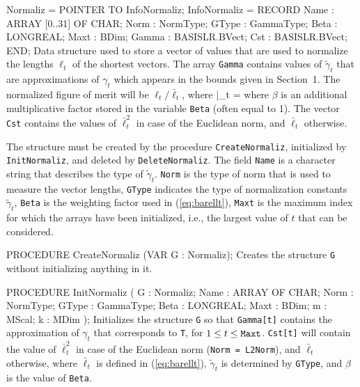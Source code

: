    Normaliz = POINTER TO InfoNormaliz;
   InfoNormaliz = RECORD
      Name  : ARRAY [0..31] OF CHAR;
      Norm  : NormType;
      GType : GammaType;
      Beta  : LONGREAL;
      Maxt  : BDim;
      Gamma : BASISLR.BVect;
      Cst   : BASISLR.BVect;
      END;
\endcode
  \tabb Data structure used to store a vector of values 
   that are used to normalize the lengths
   $\ell_t$ of the shortest vectors.  
   The array {\tt Gamma} contains values of $\tilde\gamma_t$ that are  
   approximations of $\gamma_t$ which appears in the bounds given
   in Section~1.
   The normalized figure of merit will be $\ell_t/\bar\ell_t$, where
  \eq             
    \bar\ell_t = 
  \endeq
   where $\beta$ is an additional multiplicative factor 
   stored in the variable {\tt Beta} (often equal to 1).
   The vector {\tt Cst} contains the values of $\bar\ell_t^2$ 
   in case of the Euclidean norm, and $\bar\ell_t$ otherwise.

   The structure must be created by the procedure {\tt CreateNormaliz},
   initialized by {\tt InitNormaliz}, and deleted by
   {\tt DeleteNormaliz}.
   The field {\tt Name} is a character string that describes the type of 
   $\tilde\gamma_t$.
   {\tt Norm} is the type of norm that is used to measure
   the vector lengths, {\tt GType} indicates the type of normalization 
   constants $\tilde\gamma_t$, 
   {\tt Beta} is the weighting factor used in (\ref{eq:barellt}),
   {\tt Maxt} is the maximum index for which the arrays have been
   initialized, i.e., the largest value of $t$ that can be considered.
  \endtabb
\code

PROCEDURE CreateNormaliz (VAR G : Normaliz);
\endcode
 \tab  Creates the structure {\tt G} without initializing anything in it.
 \endtab
\code

PROCEDURE InitNormaliz 
   (   G  : Normaliz;
    Name  : ARRAY OF CHAR;
    Norm  : NormType;
    GType : GammaType;
    Beta  : LONGREAL;
    Maxt  : BDim;
       m  : MScal;
       k  : MDim
   );
\endcode
 \tab  Initializes the structure {\tt G} so that 
   {\tt Gamma[t]} contains the 
   approximation of $\gamma_t$ that corresponds to {\tt T},
   for $1\le t\le {\tt Maxt}$. 
   {\tt Cst[t]} will contain the value of $\bar\ell_t^2$ 
   in case of the Euclidean norm ({\tt Norm = L2Norm}), 
   and $\bar\ell_t$ otherwise,
   where $\bar\ell_t$ is defined in (\ref{eq:barellt}),
   $\tilde\gamma_t$ is determined by {\tt GType},  and
   $\beta$ is the value of {\tt Beta}.

